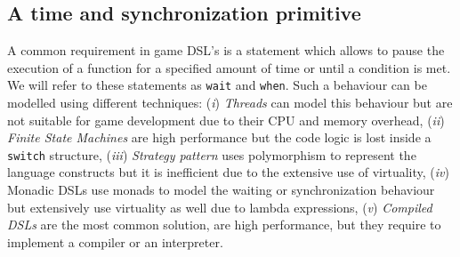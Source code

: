 \subsection{A time and synchronization primitive}
\label{subsec:synchronization}
\begin{comment}
A common requirement in game DSL's is a statement which allows to pause the execution of a function for a specified amount of time or until a condition is met. We will refer to these statements as \texttt{wait} and \texttt{when}. Such a behaviour can be modelled using different techniques: (\textit{i}) \textit{Threads} allow to solve such synchronization problems but they are unsuitable for video game development because of memory usage and CPU overhead due to their scheduling, (\textit{ii}) \textit{Finite State Machines} allow to represent such concurrent behaviours \cite{CASANOVA2_PAPER} by using a \texttt{switch} control structure to an opportune state. This solution is high-performance but the logic of the behaviour is lost inside the \texttt{switch} structure, (\textit{iii}) \textit{Strategy pattern} allows to represent the instructions of the language has polymorphic data types. Each concurrent structure is implemented by a class which defines the behaviour of the current structure, and the next structure to execute. This solution is not high-performance due to virtuality and the high number of object instantiations, (\textit{iv}) \textit{Monadic DSL} uses a variation of the state monad. It represents scripts with two states: \textit{Done} and \textit{Next}. The bind operator is used to simulate the code interruption. This approach is simple and elegant but it suffers of the same virtuality problems of the strategy pattern, this time because of the extensive use of lambda expressions, (\textit{v}) \textit{Compiled DSL} is the most common solution and allows to represent the concurrency by using concurrent control structures defined in the language. Compiled DSL's grant high-performance and code readability, but they require to implement a compiler or an interpreter for it. This situation is summarized in Table \ref{tab:techniques}.
\end{comment}
A common requirement in game DSL's is a statement which allows to pause the execution of a function for a specified amount of time or until a condition is met. We will refer to these statements as \texttt{wait} and \texttt{when}. Such a behaviour can be modelled using different techniques: (\textit{i}) \textit{Threads} can model this behaviour but are not suitable for game development due to their CPU and memory overhead, (\textit{ii}) \textit{Finite State Machines} are high performance but the code logic is lost inside a \texttt{switch} structure, (\textit{iii}) \textit{Strategy pattern} uses polymorphism to represent the language constructs but it is inefficient due to the extensive use of virtuality, (\textit{iv}) Monadic DSLs use monads to model the waiting or synchronization behaviour but extensively use virtuality as well due to lambda expressions, (\textit{v}) \textit{Compiled DSLs} are the most common solution, are high performance, but they require to implement a compiler or an interpreter.


